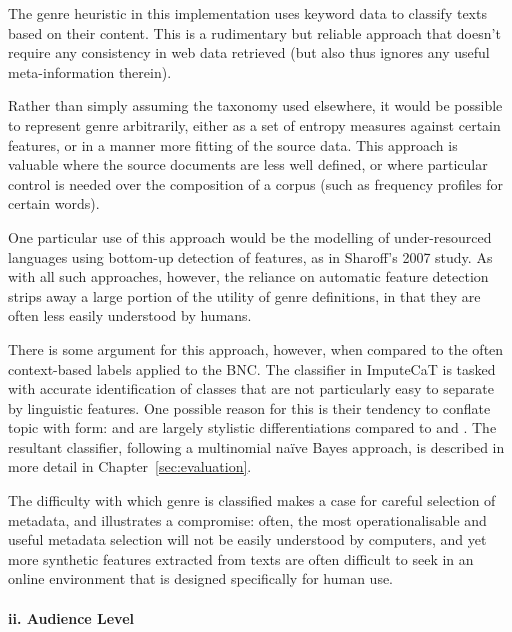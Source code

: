 The genre heuristic in this implementation uses keyword data to classify texts based on their content.  This is a rudimentary but reliable approach that doesn't require any consistency in web data retrieved (but also thus ignores any useful meta-information therein).


Rather than simply assuming the taxonomy used elsewhere, it would be possible to represent genre arbitrarily, either as a set of entropy measures against certain features, or in a manner more fitting of the source data.  This approach is valuable where the source documents are less well defined, or where particular control is needed over the composition of a corpus (such as frequency profiles for certain words).

One particular use of this approach would be the modelling of under-resourced languages using bottom-up detection of features, as in Sharoff's 2007 study\cite{sharoff2007classifying}.  As with all such approaches, however, the reliance on automatic feature detection strips away a large portion of the utility of genre definitions, in that they are often less easily understood by humans.  


There is some argument for this approach, however, when compared to the often context-based labels applied to the BNC\@.  The classifier in ImputeCaT is tasked with accurate identification of classes that are not particularly easy to separate by linguistic features.  One possible reason for this is their tendency to conflate topic with form:  and  are largely stylistic differentiations compared to  and .  The resultant classifier, following a multinomial na\"ive Bayes approach\cite{mccallum1998comparison}, is described in more detail in Chapter~\ref{sec:evaluation}.


The difficulty with which genre is classified makes a case for careful selection of metadata, and illustrates a compromise: often, the most operationalisable and useful metadata selection will not be easily understood by computers, and yet more synthetic features extracted from texts are often difficult to seek in an online environment that is designed specifically for human use.


\paragraph{ii. Audience Level}

